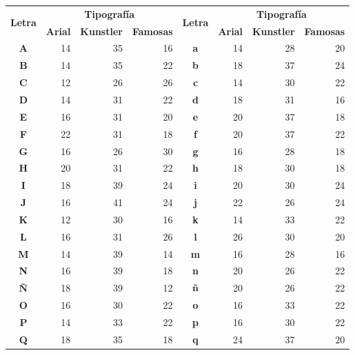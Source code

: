 \documentclass[runningheads,a4paper]{llncs}
\begin{document}
\begin{table}
\begin{tabular}{c|r|r|r|c|r|r|r}
\hline
\multirow{2}{*}{\textbf{Letra}} & \multicolumn{3}{|c|}{\textbf{Tipografía}} & \multirow{2}{*}{\textbf{Letra}} & \multicolumn{3}{|c}{\textbf{Tipografía}} \\
\cline{2-4}\cline{6-8}
    & \textbf{Arial} & \textbf{Kunstler} & \textbf{Famosas} &     & \textbf{Arial} & \textbf{Kunstler} & \textbf{Famosas} \\\hline\hline
\textbf{A}   & 14   &   35   &   16   &   \textbf{a}   & 14   &   28   &   20   \\\hline
\textbf{B}   & 14   &   35   &   22   &   \textbf{b}   & 18   &   37   &   24   \\\hline
\textbf{C}   & 12   &   26   &   26   &   \textbf{c}   & 14   &   30   &   22   \\\hline
\textbf{D}   & 14   &   31   &   22   &   \textbf{d}   & 18   &   31   &   16   \\\hline
\textbf{E}   & 16   &   31   &   20   &   \textbf{e}   & 20   &   37   &   18   \\\hline
\textbf{F}   & 22   &   31   &   18   &   \textbf{f}   & 20   &   37   &   22   \\\hline
\textbf{G}   & 16   &   26   &   30   &   \textbf{g}   & 16   &   28   &   18   \\\hline
\textbf{H}   & 20   &   31   &   22   &   \textbf{h}   & 18   &   30   &   18   \\\hline
\textbf{I}   & 18   &   39   &   24   &   \textbf{i}   & 20   &   30   &   24   \\\hline
\textbf{J}   & 16   &   41   &   24   &   \textbf{j}   & 22   &   26   &   24   \\\hline
\textbf{K}   & 12   &   30   &   16   &   \textbf{k}   & 14   &   33   &   22   \\\hline
\textbf{L}   & 16   &   31   &   26   &   \textbf{l}   & 26   &   30   &   20   \\\hline
\textbf{M}   & 14   &   39   &   14   &   \textbf{m}   & 16   &   28   &   16   \\\hline
\textbf{N}   & 16   &   39   &   18   &   \textbf{n}   & 20   &   26   &   22   \\\hline
\textbf{Ñ}   & 18   &   39   &   12   &   \textbf{ñ}   & 20   &   26   &   22   \\\hline
\textbf{O}   & 16   &   30   &   22   &   \textbf{o}   & 16   &   33   &   22   \\\hline
\textbf{P}   & 14   &   33   &   22   &   \textbf{p}   & 16   &   30   &   22   \\\hline
\textbf{Q}   & 18   &   35   &   18   &   \textbf{q}   & 24   &   37   &   20   \\\hline

\end{tabular}
\end{table}
\end{document}
